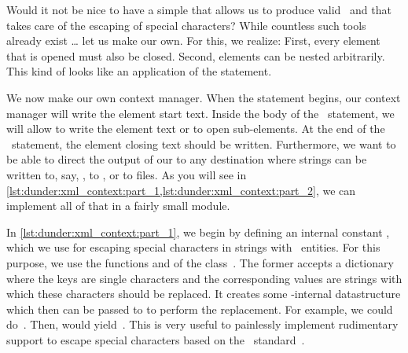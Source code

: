 %
%
%
%
%

Would it not be nice to have a simple  that allows us to produce valid~ and that takes care of the escaping of special characters?
While countless such tools already exist {\dots} let us make our own.
For this, we realize:
First, every  element that is opened must also be closed.
Second,  elements can be nested arbitrarily.
This kind of looks like an application of the  statement.

We now make our own context manager.
When the  statement begins, our context manager will write the element start text.
Inside the body of the ~statement, we will allow to write the element text or to open sub-elements.
At the end of the ~statement, the  element closing text should be written.
Furthermore, we want to be able to direct the output of our  to any destination where strings can be written to, say, , to , or to files.
As you will see in \cref{lst:dunder:xml_context:part_1,lst:dunder:xml_context:part_2}, we can implement all of that in a fairly small module.

In \cref{lst:dunder:xml_context:part_1}, we begin by defining an internal constant , which we use for  escaping special characters in strings with ~entities.
For this purpose, we use the functions  and  of the class~.
The former accepts a dictionary where the keys are single characters and the corresponding values are strings with which these characters should be replaced.
It creates some \python-internal datastructure which then can be passed to  to perform the replacement.
For example, we could do~.
Then,  would yield~.
This is very useful to painlessly implement rudimentary support to escape special characters based on the ~standard~\cite{BPSMM2008EMLX1FE}.

